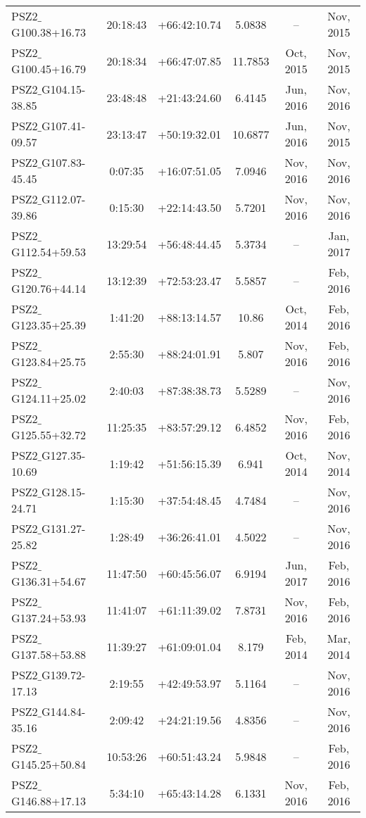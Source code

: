 \documentclass[apj, revtex4]{emulateapj}
\begin{document}
\begin{longtable*}{lccccc}
	PSZ2$\_$G100.38+16.73 & 20:18:43 & +66:42:10.74 & 5.0838 & -- & Nov, 2015 \\
	PSZ2$\_$G100.45+16.79 & 20:18:34 & +66:47:07.85 & 11.7853 & Oct, 2015 & Nov, 2015 \\
	PSZ2$\_$G104.15-38.85 & 23:48:48 & +21:43:24.60 & 6.4145 & Jun, 2016 & Nov, 2016 \\
	PSZ2$\_$G107.41-09.57 & 23:13:47 & +50:19:32.01 & 10.6877 & Jun, 2016 & Nov, 2015 \\
	PSZ2$\_$G107.83-45.45 & 0:07:35 & +16:07:51.05 & 7.0946 & Nov, 2016 & Nov, 2016 \\
	PSZ2$\_$G112.07-39.86 & 0:15:30 & +22:14:43.50 & 5.7201 & Nov, 2016 & Nov, 2016 \\
	PSZ2$\_$G112.54+59.53 & 13:29:54 & +56:48:44.45 & 5.3734 & -- & Jan, 2017 \\
	PSZ2$\_$G120.76+44.14 & 13:12:39 & +72:53:23.47 & 5.5857 & -- & Feb, 2016 \\
	PSZ2$\_$G123.35+25.39 & 1:41:20 & +88:13:14.57 & 10.86 & Oct, 2014 & Feb, 2016 \\
	PSZ2$\_$G123.84+25.75 & 2:55:30 & +88:24:01.91 & 5.807 & Nov, 2016 & Feb, 2016 \\
	PSZ2$\_$G124.11+25.02 & 2:40:03 & +87:38:38.73 & 5.5289 & -- & Nov, 2016 \\
	PSZ2$\_$G125.55+32.72 & 11:25:35 & +83:57:29.12 & 6.4852 & Nov, 2016 & Feb, 2016 \\
	PSZ2$\_$G127.35-10.69 & 1:19:42 & +51:56:15.39 & 6.941 & Oct, 2014 & Nov, 2014 \\
	PSZ2$\_$G128.15-24.71 & 1:15:30 & +37:54:48.45 & 4.7484 & -- & Nov, 2016 \\
	PSZ2$\_$G131.27-25.82 & 1:28:49 & +36:26:41.01 & 4.5022 & -- & Nov, 2016 \\
	PSZ2$\_$G136.31+54.67 & 11:47:50 & +60:45:56.07 & 6.9194 & Jun, 2017 & Feb, 2016 \\
	PSZ2$\_$G137.24+53.93 & 11:41:07 & +61:11:39.02 & 7.8731 & Nov, 2016 & Feb, 2016 \\
	PSZ2$\_$G137.58+53.88 & 11:39:27 & +61:09:01.04 & 8.179 & Feb, 2014 & Mar, 2014 \\
	PSZ2$\_$G139.72-17.13 & 2:19:55 & +42:49:53.97 & 5.1164 & -- & Nov, 2016 \\
	PSZ2$\_$G144.84-35.16 & 2:09:42 & +24:21:19.56 & 4.8356 & -- & Nov, 2016 \\
	PSZ2$\_$G145.25+50.84 & 10:53:26 & +60:51:43.24 & 5.9848 & -- & Feb, 2016 \\
	PSZ2$\_$G146.88+17.13 & 5:34:10 & +65:43:14.28 & 6.1331 & Nov, 2016 & Feb, 2016 \\

\end{longtable*}
\end{document}
